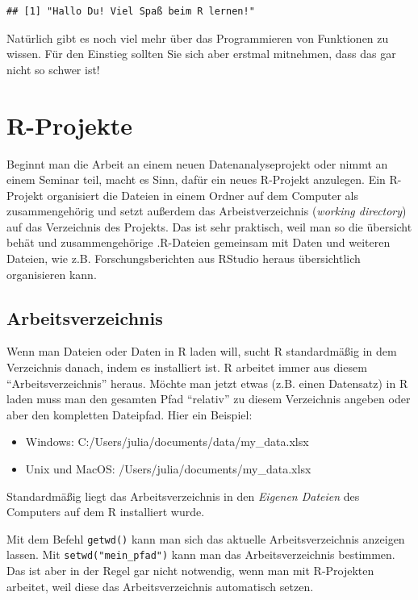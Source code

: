 \documentclass[
]{book}
\providecommand{\tightlist}{%
  \setlength{\itemsep}{0pt}\setlength{\parskip}{0pt}}
\begin{document}
\begin{verbatim}
## [1] "Hallo Du! Viel Spaß beim R lernen!"
\end{verbatim}

Natürlich gibt es noch viel mehr über das Programmieren von Funktionen zu wissen. Für den Einstieg sollten Sie sich aber erstmal mitnehmen, dass das gar nicht so schwer ist!

\hypertarget{r-projekte}{%
\section{R-Projekte}\label{r-projekte}}

Beginnt man die Arbeit an einem neuen Datenanalyseprojekt oder nimmt an einem Seminar teil, macht es Sinn, dafür ein neues R-Projekt anzulegen. Ein R-Projekt organisiert die Dateien in einem Ordner auf dem Computer als zusammengehörig und setzt außerdem das Arbeistverzeichnis (\emph{working directory}) auf das Verzeichnis des Projekts. Das ist sehr praktisch, weil man so die übersicht behät und zusammengehörige .R-Dateien gemeinsam mit Daten und weiteren Dateien, wie z.B. Forschungsberichten aus RStudio heraus übersichtlich organisieren kann.

\hypertarget{arbeitsverzeichnis}{%
\subsection{Arbeitsverzeichnis}\label{arbeitsverzeichnis}}

Wenn man Dateien oder Daten in R laden will, sucht R standardmäßig in dem Verzeichnis danach, indem es installiert ist. R arbeitet immer aus diesem ``Arbeitsverzeichnis'' heraus.
Möchte man jetzt etwas (z.B. einen Datensatz) in R laden muss man den gesamten Pfad ``relativ'' zu diesem Verzeichnis angeben oder aber den kompletten Dateipfad. Hier ein Beispiel:

\begin{itemize}
\tightlist
\item
  Windows: C:/Users/julia/documents/data/my\_data.xlsx
\item
  Unix und MacOS: /Users/julia/documents/my\_data.xlsx
\end{itemize}

Standardmäßig liegt das Arbeitsverzeichnis in den \emph{Eigenen Dateien} des Computers auf dem R installiert wurde.

Mit dem Befehl \texttt{getwd()} kann man sich das aktuelle Arbeitsverzeichnis anzeigen lassen. Mit \texttt{setwd("mein\_pfad")} kann man das Arbeitsverzeichnis bestimmen. Das ist aber in der Regel gar nicht notwendig, wenn man mit R-Projekten arbeitet, weil diese das Arbeitsverzeichnis automatisch setzen.
\end{document}
